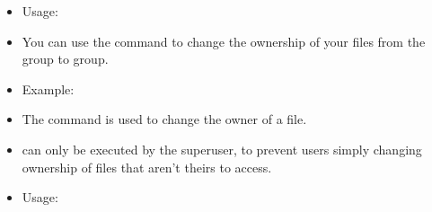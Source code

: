 \documentclass[10pt,t]{beamer}
\begin{document}
\begin{frame}
\begin{itemize}
    \item[] Usage: 
    \item You can use the  command to change the ownership of your files from the  group to  group.
    \item[] Example: 
    \item The  command is used to  change the owner of a file.
    \item {} can only be executed by the superuser, to prevent users simply changing ownership of files that aren't theirs to access. 
    \item[] Usage: 
  \end{itemize}
\end{frame}
\end{document}
